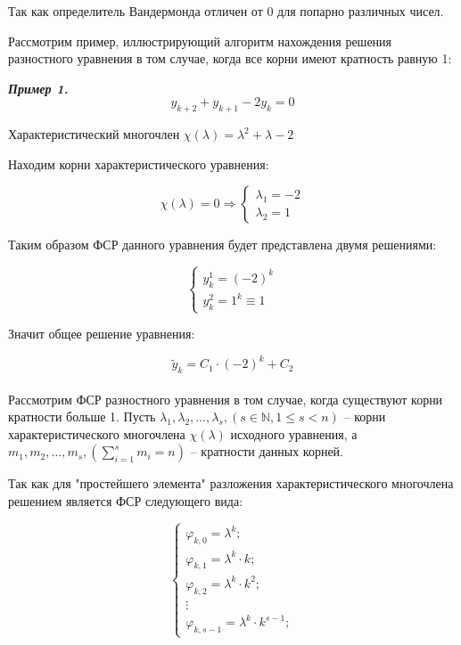 \documentclass[10pt,a4paper]{article}
\begin{document}
	Так как определитель Вандермонда отличен от 0 для попарно различных чисел.
	
	Рассмотрим пример, иллюстрирующий алгоритм нахождения решения разностного
	уравнения в том случае, когда все корни имеют кратность равную 1:
	
	\textit{\textbf{Пример 1.}} \begin{equation}
		y_{k + 2} + y_{k + 1} - 2y_{k} = 0
	\end{equation}
	
	Характеристический многочлен $\chi\left(\lambda\right) = \lambda^{2} + 
	\lambda - 2$
	
	Находим корни характеристического уравнения:
	
	\begin{equation}
		\chi\left(\lambda\right) = 0 \Rightarrow 
		\begin{cases}
			\lambda_{1} = -2
			\\
			\lambda_{2} = 1	
		\end{cases}
	\end{equation}
	
	Таким образом ФСР данного уравнения будет представлена двумя решениями:
	
	\begin{equation}
		\begin{cases}
			y_{k}^{1} = \left(-2\right)^{k}
			\\
			y_{k}^{2} = 1^{k} \equiv 1
		\end{cases}
	\end{equation}
	
	Значит общее решение уравнения:
	
	\begin{equation}
		\widetilde{y}_{k} = C_{1}\cdot\left(-2\right)^{k} + C_{2}
	\end{equation}\\
	
	Рассмотрим ФСР разностного уравнения в том случае, когда существуют корни 
	кратности больше 1. Пусть $\lambda_{1}, \lambda_{2}, \ldots, \lambda_{s}, 
	\left(s \in \mathbb{N}, 1 \leqslant s < n\right)$ -- корни 
	характеристического многочлена $\chi\left(\lambda\right)$ исходного 
	уравнения, а $m_{1}, m_{2}, \ldots, m_{s}, \left(\sum\limits_{i = 1}^{s}
	m_{i} = n\right)$ -- кратности данных корней.
	
	Так как для "простейшего элемента" разложения характеристического многочлена 
	решением является ФСР следующего вида:
	
	\begin{equation}
		\begin{cases}
			\varphi_{k, 0} = \lambda^{k};
			\\
			\varphi_{k, 1} = \lambda^{k}\cdot k;
			\\
			\varphi_{k, 2} = \lambda^{k}\cdot k^{2};
			\\
			\vdots
			\\
			\varphi_{k, s - 1} = \lambda^{k}\cdot k^{s - 1};
		\end{cases}
	\end{equation}
	
\end{document}
